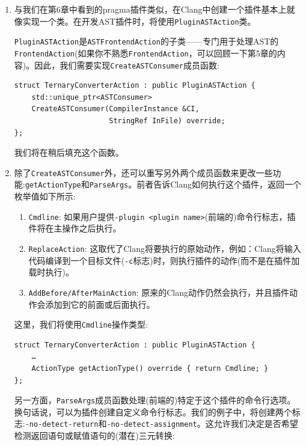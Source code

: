\begin{enumerate}
\item 与我们在第6章中看到的pragma插件类似，在Clang中创建一个插件基本上就像实现一个类。在开发AST插件时，将使用\texttt{PluginASTAction}类。

\texttt{PluginASTAction}是\texttt{ASTFrontendAction}的子类——专门用于处理AST的\texttt{FrontendAction}(如果你不熟悉\texttt{FrontendAction}，可以回顾一下第5章的内容)。因此，我们需要实现\texttt{CreateASTConsumer}成员函数:

\begin{lstlisting}[style=styleCXX]
struct TernaryConverterAction : public PluginASTAction {
	std::unique_ptr<ASTConsumer>
	CreateASTConsumer(CompilerInstance &CI,
                      StringRef InFile) override;
};
\end{lstlisting}

我们将在稍后填充这个函数。

\item 除了\texttt{CreateASTConsumer}外，还可以重写另外两个成员函数来更改一些功能:\texttt{getActionType}和\texttt{ParseArgs}。前者告诉Clang如何执行这个插件，返回一个枚举值如下所示:

\begin{enumerate}[label=\alph*.]
\item \texttt{Cmdline}: 如果用户提供\texttt{-plugin <plugin name>}(前端的)命令行标志，插件将在主操作之后执行。

\item \texttt{ReplaceAction}: 这取代了Clang将要执行的原始动作，例如：Clang将输入代码编译到一个目标文件(\texttt{-c}标志)时，则执行插件的动作(而不是在插件加载时执行)。

\item \texttt{AddBefore/AfterMainAction}: 原来的Clang动作仍然会执行，并且插件动作会添加到它的前面或后面执行。
\end{enumerate}

这里，我们将使用\texttt{Cmdline}操作类型:

\begin{lstlisting}[style=styleCXX]
struct TernaryConverterAction : public PluginASTAction {
	…
	ActionType getActionType() override { return Cmdline; }
};
\end{lstlisting}

另一方面，\texttt{ParseArgs}成员函数处理(前端的)特定于这个插件的命令行选项。换句话说，可以为插件创建自定义命令行标志。我们的例子中，将创建两个标志:\texttt{-no-detect-return}和\texttt{-no-detect-assignment}。这允许我们决定是否希望检测返回语句或赋值语句的(潜在)三元转换:


\end{enumerate}
